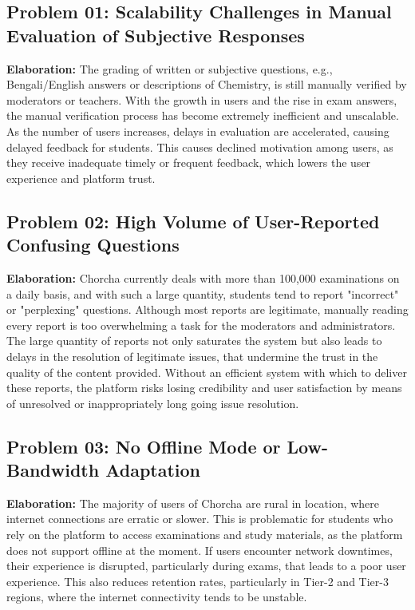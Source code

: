 \documentclass[12pt,a4paper,oneside]{book}
\begin{document}
\subsection{Problem 01: Scalability Challenges in Manual Evaluation of Subjective Responses}
\textbf{Elaboration:} The grading of written or subjective questions, e.g., Bengali/English answers or descriptions of Chemistry, is still manually verified by moderators or teachers. With the growth in users and the rise in exam answers, the manual verification process has become extremely inefficient and unscalable. As the number of users increases, delays in evaluation are accelerated, causing delayed feedback for students. This causes declined motivation among users, as they receive inadequate timely or frequent feedback, which lowers the user experience and platform trust.

\subsection{Problem 02: High Volume of User-Reported Confusing Questions}
\textbf{Elaboration:} Chorcha currently deals with more than 100,000 examinations on a daily basis, and with such a large quantity, students tend to report "incorrect" or "perplexing" questions. Although most reports are legitimate, manually reading every report is too overwhelming a task for the moderators and administrators. The large quantity of reports not only saturates the system but also leads to delays in the resolution of legitimate issues, that undermine the trust in the quality of the content provided. Without an efficient system with which to deliver these reports, the platform risks losing credibility and user satisfaction by means of unresolved or inappropriately long going issue resolution.

\subsection{Problem 03: No Offline Mode or Low-Bandwidth Adaptation}
\textbf{Elaboration:} The majority of users of Chorcha are rural in location, where internet connections are erratic or slower. This is problematic for students who rely on the platform to access examinations and study materials, as the platform does not support offline at the moment. If users encounter network downtimes, their experience is disrupted, particularly during exams, that leads to a poor user experience. This also reduces retention rates, particularly in Tier-2 and Tier-3 regions, where the internet connectivity tends to be unstable.
\end{document}
